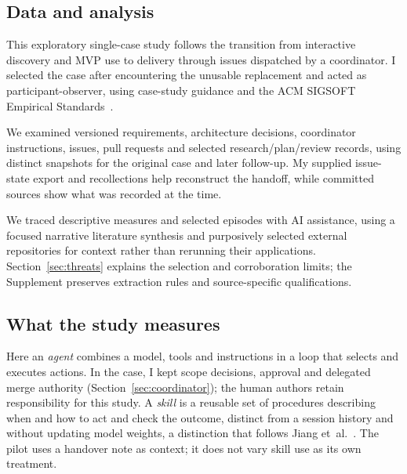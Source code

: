 \documentclass[11pt,a4paper]{article}
\begin{document}
\subsection{Data and analysis}

This exploratory single-case study follows the transition from interactive
discovery and MVP use to delivery through issues dispatched by a coordinator. I selected the case after encountering the unusable replacement and acted as participant-observer, using case-study guidance and the ACM SIGSOFT Empirical Standards~\cite{runeson2009guidelines,sigsoft2021standards}.

We examined versioned requirements, architecture decisions, coordinator
instructions, issues, pull requests and selected research/plan/review
records, using distinct snapshots for the original case and later follow-up.
My supplied issue-state export and recollections help reconstruct the
handoff, while committed sources show what was recorded at the time.

We traced descriptive measures and selected episodes with AI assistance,
using a focused narrative literature synthesis and purposively selected
external repositories for context rather than rerunning their applications.
Section~\ref{sec:threats} explains the selection and corroboration limits;
the Supplement preserves extraction rules and source-specific qualifications.

\subsection{What the study measures}\label{sec:constructs}

Here an \emph{agent} combines a model, tools and instructions in a loop that
selects and executes actions. In the case, I kept scope decisions,
approval and delegated merge authority (Section~\ref{sec:coordinator});
the human authors retain responsibility for this study.
A \emph{skill} is a reusable set of procedures describing when and how to
act and check the outcome, distinct from a session history and without updating model weights, a distinction that follows
Jiang et~al.~\cite[Sec.~1]{jiang2026skills}. The pilot uses a handover
note as context; it does not vary skill use as its own treatment.
\end{document}

